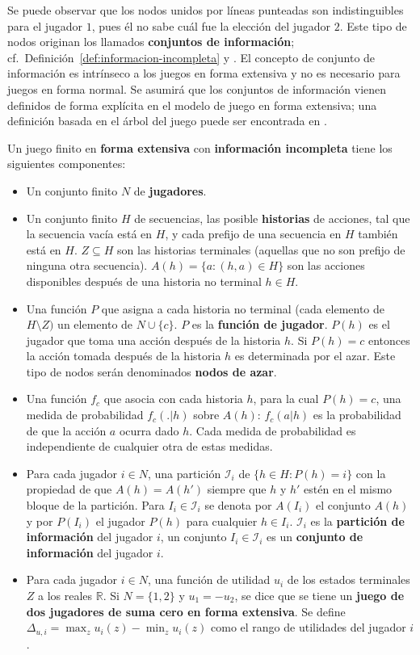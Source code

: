 Se puede observar que los nodos unidos por líneas punteadas son indistinguibles para el jugador $1$, pues él no sabe cuál fue la elección del jugador $2$. Este tipo de nodos originan los llamados \textbf{conjuntos de información}; cf.\ Definición~\ref{def:informacion-incompleta} y \cite[p.~200]{bib:course-game-theory}. El concepto de conjunto de información es intrínseco a los juegos en forma extensiva y no es necesario para juegos en forma normal. Se asumirá que los conjuntos de información vienen definidos de forma explícita en el modelo de juego en forma extensiva; una definición basada en el árbol del juego puede ser encontrada en \cite{bib:conceptos-basicos}.

\begin{definition}
\label{def:informacion-incompleta}
Un juego finito en \textbf{forma extensiva} con \textbf{información incompleta} tiene los siguientes componentes:
\begin{itemize}[]
  \item Un conjunto finito $N$ de \textbf{jugadores}.
  \item Un conjunto finito $H$ de secuencias, las posible \textbf{historias} de acciones, tal que la secuencia vacía está en $H$, y cada prefijo de una secuencia en $H$ también está en $H$. $Z \subseteq H$ son las historias terminales (aquellas que no son prefijo de ninguna otra secuencia). $A(h) = \{ a : (h, a) \in H \}$ son las acciones disponibles después de una historia no terminal $h \in H$.
  \item Una función $P$ que asigna a cada historia no terminal (cada elemento de $H \setminus Z)$ un elemento de $N \cup \{c \}$. $P$ es la \textbf{función de jugador}. $P(h)$ es el jugador que toma una acción después de la historia $h$. Si $P(h) = c$ entonces la acción tomada después de la historia $h$ es determinada por el azar. Este tipo de nodos serán denominados \textbf{nodos de azar}.
  \item Una función $f_c$ que asocia con cada historia $h$, para la cual $P(h) = c$, una medida de probabilidad $f_c(.|h)$ sobre $A(h)$: $f_c(a|h)$ es la probabilidad de que la acción $a$ ocurra dado $h$.  Cada medida de probabilidad es independiente de cualquier otra de estas medidas.
  \item Para cada jugador $i \in N$, una partición $\mathcal{I}_i$ de $\{h \in H : P(h) = i\}$ con la propiedad de que $A(h) = A(h')$ siempre que $h$ y $h'$ estén en el mismo bloque de la partición. Para $I_i \in \mathcal{I}_i$ se denota por $A(I_i)$ el conjunto $A(h)$ y por $P(I_i)$ el jugador $P(h)$ para cualquier $h \in I_i$. $\mathcal{I}_i$ es la \textbf{partición de información} del jugador $i$, un conjunto $I_i \in \mathcal{I}_i$ es un \textbf{conjunto de información} del jugador $i$.
  \item Para cada jugador $i \in N$, una función de utilidad $u_i$ de los estados terminales $Z$ a los reales $\mathbb{R}$. Si $N = \{1,2\}$ y $u_1 = -u_2$, se dice que se tiene un \textbf{juego de dos jugadores de suma cero en forma extensiva}. Se define $\Delta_{u,i} = \max_z u_i(z) - \min_z u_i(z)$ como el rango de utilidades del jugador $i$.
\end{itemize}
\end{definition}

